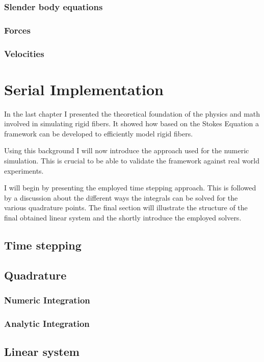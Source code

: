\documentclass[a4paper,11pt]{kth-mag}
\begin{document}
\subsection{Slender body equations}
\subsection{Forces}
\subsection{Velocities}

\chapter{Serial Implementation}
\label{cha:serial_implementation}

In the last chapter I presented the theoretical foundation of the physics and math involved in simulating rigid fibers. It showed how based on the Stokes Equation a framework can be developed to efficiently model rigid fibers.

Using this background I will now introduce the approach used for the numeric simulation. This is crucial to be able to validate the framework against real world experiments.

I will begin by presenting the employed time stepping approach. This is followed by a discussion about the different ways the integrals can be solved for the various quadrature points. The final section will illustrate the structure of the final obtained linear system and the shortly introduce the employed solvers.

\section{Time stepping}
\section{Quadrature}
\subsection{Numeric Integration}
\subsection{Analytic Integration}
\section{Linear system}
\end{document}
